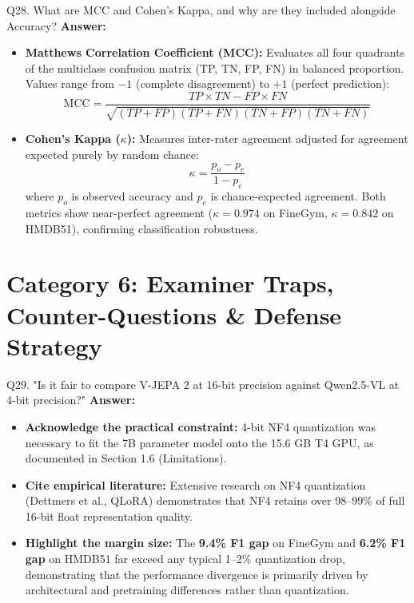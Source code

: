\documentclass[a4paper, 11pt]{article}
\begin{document}
\begin{questionbox}{Q28. What are MCC and Cohen's Kappa, and why are they included alongside Accuracy?}
\textbf{Answer:}
\begin{itemize}
    \item \textbf{Matthews Correlation Coefficient (MCC):} Evaluates all four quadrants of the multiclass confusion matrix (TP, TN, FP, FN) in balanced proportion. Values range from $-1$ (complete disagreement) to $+1$ (perfect prediction):
    \[
    \text{MCC} = \frac{TP \times TN - FP \times FN}{\sqrt{(TP+FP)(TP+FN)(TN+FP)(TN+FN)}}
    \]
    \item \textbf{Cohen's Kappa ($\kappa$):} Measures inter-rater agreement adjusted for agreement expected purely by random chance:
    \[
    \kappa = \frac{p_o - p_e}{1 - p_e}
    \]
    where $p_o$ is observed accuracy and $p_e$ is chance-expected agreement. Both metrics show near-perfect agreement ($\kappa = 0.974$ on FineGym, $\kappa = 0.842$ on HMDB51), confirming classification robustness.
\end{itemize}
\end{questionbox}

\newpage
\section{Category 6: Examiner Traps, Counter-Questions \& Defense Strategy}

\begin{questionbox}{Q29. "Is it fair to compare V-JEPA 2 at 16-bit precision against Qwen2.5-VL at 4-bit precision?"}
\textbf{Answer:}
\begin{itemize}
    \item \textbf{Acknowledge the practical constraint:} 4-bit NF4 quantization was necessary to fit the 7B parameter model onto the 15.6 GB T4 GPU, as documented in Section 1.6 (Limitations).
    \item \textbf{Cite empirical literature:} Extensive research on NF4 quantization (Dettmers et al., QLoRA) demonstrates that NF4 retains over 98--99\% of full 16-bit float representation quality.
    \item \textbf{Highlight the margin size:} The \textbf{9.4\% F1 gap} on FineGym and \textbf{6.2\% F1 gap} on HMDB51 far exceed any typical 1--2\% quantization drop, demonstrating that the performance divergence is primarily driven by architectural and pretraining differences rather than quantization.
\end{itemize}
\end{questionbox}
\end{document}
